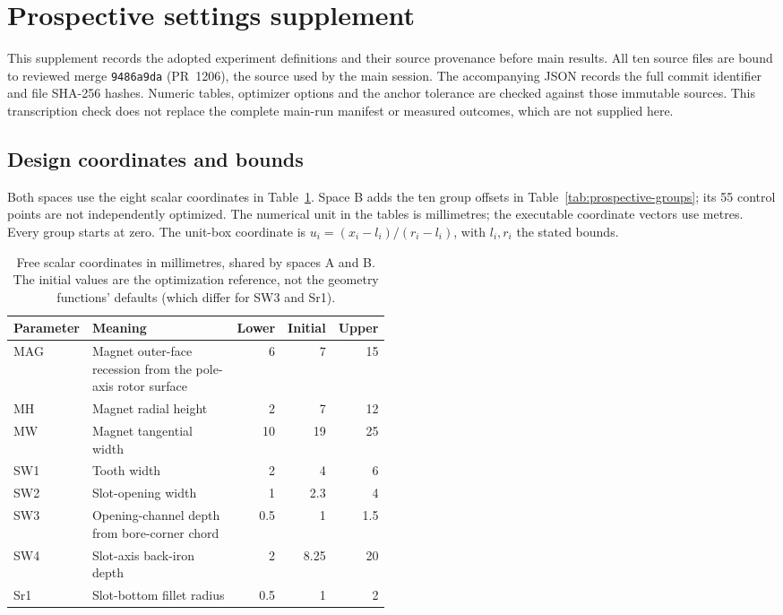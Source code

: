 \section{Prospective settings supplement}
\label{sec:prospective-settings}

This supplement records the adopted experiment definitions and their source
provenance before main results. All ten source files are bound to reviewed
merge \texttt{9486a9da} (PR~1206), the source used by the main session.
The accompanying JSON records the full commit identifier and file SHA-256
hashes. Numeric tables, optimizer options and the anchor tolerance are
checked against those immutable sources. This transcription check does not
replace the complete main-run manifest or measured outcomes, which are not
supplied here.

\subsection{Design coordinates and bounds}

Both spaces use the eight scalar coordinates in
Table~\ref{tab:prospective-scalars}. Space B adds the ten group offsets in
Table~\ref{tab:prospective-groups}; its 55 control points are not independently
optimized. The numerical unit in the tables is millimetres; the executable
coordinate vectors use metres. Every group starts at zero. The unit-box
coordinate is $u_i=(x_i-l_i)/(r_i-l_i)$, with $l_i,r_i$ the stated bounds.

\begin{table}[ht]
\centering\small
\begin{tabular}{lp{0.49\linewidth}rrr}
\toprule
Parameter & Meaning & Lower & Initial & Upper \\
\midrule
MAG & Magnet outer-face recession from the pole-axis rotor surface & 6 & 7 & 15 \\
MH & Magnet radial height & 2 & 7 & 12 \\
MW & Magnet tangential width & 10 & 19 & 25 \\
SW1 & Tooth width & 2 & 4 & 6 \\
SW2 & Slot-opening width & 1 & 2.3 & 4 \\
SW3 & Opening-channel depth from bore-corner chord & 0.5 & 1 & 1.5 \\
SW4 & Slot-axis back-iron depth & 2 & 8.25 & 20 \\
Sr1 & Slot-bottom fillet radius & 0.5 & 1 & 2 \\
\bottomrule
\end{tabular}
\caption{Free scalar coordinates in millimetres, shared by spaces A and B.
The initial values are the optimization reference, not the geometry
functions' defaults (which differ for SW3 and Sr1).}
\label{tab:prospective-scalars}
\end{table}

